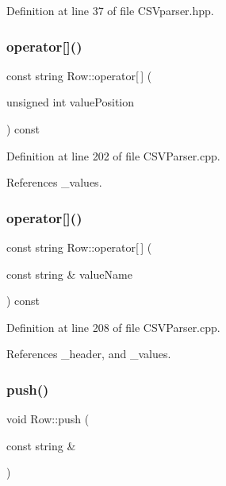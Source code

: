 Definition at line 37 of file C\+S\+Vparser.\+hpp.

\mbox{\label{class_row_ab52c9571957f0278f13bb5bcc21dccda}} 
\subsubsection{operator[]()\hspace{0.1cm}{\footnotesize\ttfamily [1/2]}}
{\footnotesize\ttfamily const string Row\+::operator[$\,$] (\begin{DoxyParamCaption}\item[{unsigned int}]{value\+Position }\end{DoxyParamCaption}) const}



Definition at line 202 of file C\+S\+V\+Parser.\+cpp.



References \+\_\+values.

\mbox{\label{class_row_a42f23dd69d591da253b7428647f16ff8}} 
\subsubsection{operator[]()\hspace{0.1cm}{\footnotesize\ttfamily [2/2]}}
{\footnotesize\ttfamily const string Row\+::operator[$\,$] (\begin{DoxyParamCaption}\item[{const string \&}]{value\+Name }\end{DoxyParamCaption}) const}



Definition at line 208 of file C\+S\+V\+Parser.\+cpp.



References \+\_\+header, and \+\_\+values.

\mbox{\label{class_row_a1d205d3f3f1e1a11a36f5bacae6632db}} 
\subsubsection{push()}
{\footnotesize\ttfamily void Row\+::push (\begin{DoxyParamCaption}\item[{const string \&}]{ }\end{DoxyParamCaption})}




